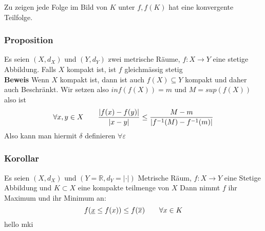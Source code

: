 \documentclass{article}
\newcommand{\mspc}{\hspace{0.7cm}}
\newcommand{\korollar}[1]{\subsubsection*{Korollar {#1}}}
\newcommand{\beweis}{\\\textbf{Beweis }}
\newcommand{\proposition}[1]{\subsubsection*{Proposition {#1}}}
\begin{document}
Zu zeigen jede Folge im Bild von $K$ unter $f,f(K)$ hat eine konvergente Teilfolge.
\proposition{} Es seien $(X,d_X)$ und $(Y,d_Y)$ zwei metrische Räume, $f:X\rightarrow Y$ eine stetige Abbildung. Falls $X$ kompakt ist, ist $f$ gleichmässig stetig
\beweis Wenn $X$ kompakt ist, dann ist auch $f(X)\subseteq Y$ kompakt und daher auch Beschränkt. Wir setzen also $inf(f(X))=m$ und $M=sup(f(X))$ also ist \[\forall x,y\in X\mspc\frac{|f(x)-f(y)|}{|x-y|}\le\frac{M-m}{|f^{-1}(M)-f^{-1}(m)|}\] 
Also kann man hiermit $\delta$ definieren $\forall \varepsilon$
\korollar{} Es seien $(X, d_X)$ und $(Y=\mathbb{R}, d_Y=|\cdot|)$ Metrische Räum, $f:X\rightarrow Y$ eine Stetige Abbildung und $K\subset X$ eine kompakte teilmenge von $X$ 
Dann nimmt $f$ ihr Maximum und ihr Minimum an:
\[f(\underline{x}\le f(x))\le f(\overline{x}) \mspc \forall x \in K\]
hello mki
\end{document}
